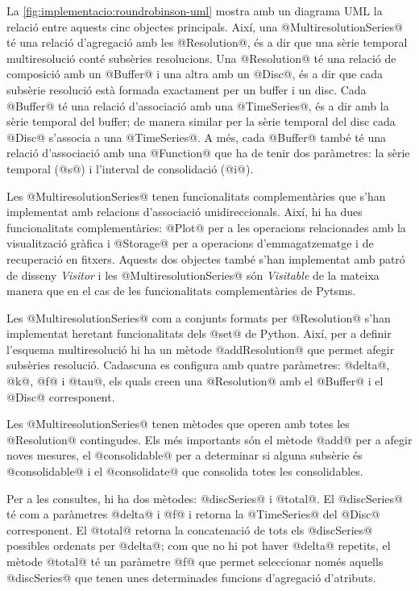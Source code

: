 La \autoref{fig:implementacio:roundrobinson-uml} mostra amb un
diagrama \gls{UML} la relació entre aquests cinc objectes principals. Així,
una @MultiresolutionSeries@ té una relació d'agregació amb les
@Resolution@, és a dir que una sèrie temporal multiresolució
conté subsèries resolucions.  Una @Resolution@ té una relació de
composició amb un @Buffer@ i una altra amb un @Disc@, és a
dir que cada subsèrie resolució està formada exactament per un buffer
i un disc. Cada @Buffer@ té una relació d'associació amb una
@TimeSeries@, és a dir amb la sèrie temporal del buffer; de
manera similar per la sèrie temporal del disc cada @Disc@
s'associa a una @TimeSeries@. A més, cada @Buffer@ també té
una relació d'associació amb una @Function@ que ha de tenir dos
paràmetres: la sèrie temporal (@s@) i l'interval de consolidació
(@i@).




Les @MultiresolutionSeries@ tenen funcionalitats complementàries
que s'han implementat amb relacions d'associació
unidireccionals. Així, hi ha dues funcionalitats complementàries:
@Plot@ per a les operacions relacionades amb la visualització
gràfica i @Storage@ per a operacions d'emmagatzematge i de
recuperació en fitxers. Aquests dos objectes també s'han implementat
amb patró de disseny \emph{Visitor} i les @MultiresolutionSeries@
són \emph{Visitable} de la mateixa manera que en el cas de les
funcionalitats complementàries de Pytsms.


Les @MultiresolutionSeries@ com a conjunts formats per
@Resolution@ s'han implementat heretant funcionalitats dels
@set@ de Python. Així, per a definir l'esquema multiresolució hi
ha un mètode @addResolution@ que permet afegir subsèries
resolució. Cadascuna es configura amb quatre paràmetres: @delta@,
@k@, @f@ i @tau@, els quals creen una @Resolution@
amb el @Buffer@ i el @Disc@ corresponent.

Les @MultiresolutionSeries@ tenen mètodes que operen amb totes les
@Resolution@ contingudes. Els més importants són el mètode @add@ per a
afegir noves mesures, el @consolidable@ per a determinar si alguna
subsèrie és @consolidable@ i el @consolidate@ que consolida totes les
consolidables.

Per a les consultes, hi ha dos mètodes: @discSeries@ i @total@. El
@discSeries@ té com a paràmetres @delta@ i @f@ i retorna la
@TimeSeries@ del @Disc@ corresponent. El @total@ retorna la
concatenació de tots els @discSeries@ possibles ordenats per @delta@;
com que no hi pot haver @delta@ repetits, el mètode @total@ té un
paràmetre @f@ que permet seleccionar només aquells @discSeries@ que
tenen unes determinades funcions d'agregació d'atributs.




